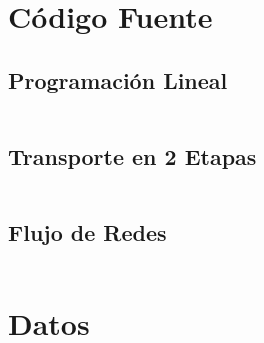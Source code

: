 \documentclass[a4paper, spanish]{article}
\begin{document}
  \begin{appendices}

    \section{Código Fuente}

      \subsection{Programación Lineal}
      \label{appendix:source-code-linear-programmming}

        \inputminted{text}{./../mosel/linear-programming-model.mos}

      \subsection{Transporte en 2 Etapas}
      \label{appendix:source-code-transportation}

        \inputminted{text}{./../mosel/two-steps-transportation-model.mos}

      \subsection{Flujo de Redes}
      \label{appendix:source-code-network-flow}

        \inputminted{text}{./../mosel/network-flow-model.mos}

    \section{Datos}
    \label{appendix:data}

      \inputminted{text}{./../mosel/data.dat}

  \end{appendices}






  \nocite{subject:pent2017}
  \nocite{tool:xpress-mosel}
  \nocite{repository:network-flow-transeuro}

  
  
\end{document}
